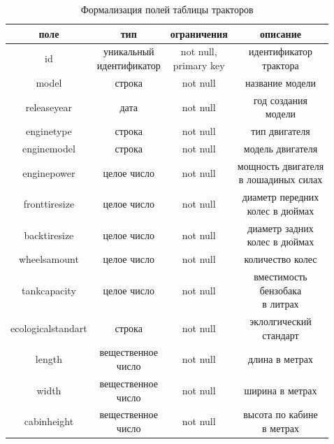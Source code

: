 \begin{table}[H]
    \centering
  
    \begin{tabular}{|c|c|c|c|} \hline 
         \textbf{поле}&  \textbf{тип}&  \textbf{ограничения}& \textbf{описание}\\ \hline 
         id &  \makecell{уникальный \\ идентификатор} & \makecell{not null,\\ primary key} & \makecell{идентификатор \\ трактора}\\ \hline 
         model&  строка&  not null& название модели\\ \hline 
         releaseyear& дата&  not null& \makecell{год создания\\ модели}\\ \hline 
         enginetype&  строка&  not null& тип двигателя\\ \hline 
         enginemodel&  строка&  not null& модель двигателя\\ \hline 
         enginepower&  целое число&  not null& \makecell{мощность двигателя\\ в лошадиных силах}\\ \hline 
         fronttiresize&  целое число&  not null& \makecell{диаметр передних\\ колес в дюймах}\\ \hline 
         backtiresize&  целое число&  not null& \makecell{диаметр задних\\ колес в дюймах}\\ \hline 
         wheelsamount&  целое число&  not null& количество колес\\ \hline
 tankcapacity& целое число& not null&\makecell{вместимость\\ бензобака\\ в литрах}\\\hline
 ecologicalstandart& строка& not null& \makecell{эклолгический\\ стандарт}\\\hline
 length& \makecell{вещественное \\число}& not null&длина в метрах\\ \hline 
 width& \makecell{вещественное \\число}& not null&ширина в метрах\\\hline
 cabinheight& \makecell{вещественное \\число}& not null&\makecell{высота по кабине\\ в метрах}\\\hline
    \end{tabular}
    \caption{Формализация полей таблицы тракторов}
    \label{tab:tractor}
\end{table}



